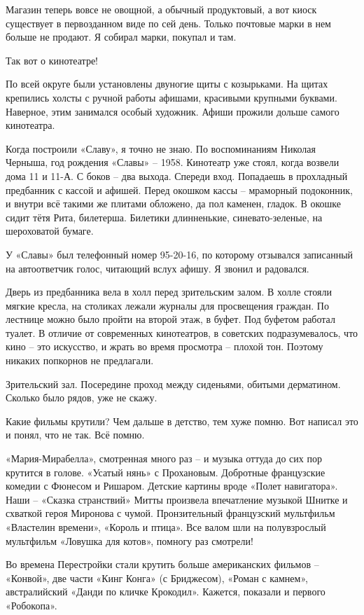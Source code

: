 Магазин теперь вовсе не овощной, а обычный продуктовый, а вот киоск существует в первозданном виде по сей день. Только почтовые марки в нем больше не продают. Я собирал марки, покупал и там.

Так вот о кинотеатре!

По всей округе были установлены двуногие щиты с козырьками. На щитах крепились холсты с ручной работы афишами, красивыми крупными буквами. Наверное, этим занимался особый художник. Афиши прожили дольше самого кинотеатра.

Когда построили «Славу», я точно не знаю. По воспоминаниям Николая Черныша, год рождения «Славы» – 1958. Кинотеатр уже стоял, когда возвели дома 11 и 11-А. С боков – два выхода. Спереди вход. Попадаешь в прохладный предбанник с кассой и афишей. Перед окошком кассы – мраморный подоконник, и внутри всё такими же плитами обложено, да пол каменен, гладок. В окошке сидит тётя Рита, билетерша. Билетики длинненькие, синевато-зеленые, на шероховатой бумаге.

У «Славы» был телефонный номер 95-20-16, по которому отзывался записанный на автоответчик голос, читающий вслух афишу. Я звонил и радовался.

Дверь из предбанника вела в холл перед зрительским залом. В холле стояли мягкие кресла, на столиках лежали журналы для просвещения граждан. По лестнице можно было пройти на второй этаж, в буфет. Под буфетом работал туалет. В отличие от современных кинотеатров, в советских подразумевалось, что кино – это искусство, и жрать во время просмотра – плохой тон. Поэтому никаких попкорнов не предлагали.

Зрительский зал. Посередине проход между сиденьями, обитыми дерматином. Сколько было рядов, уже не скажу.

Какие фильмы крутили? Чем дальше в детство, тем хуже помню. Вот написал это и понял, что не так. Всё помню.

«Мария-Мирабелла», смотренная много раз – и музыка оттуда до сих пор крутится в голове. «Усатый нянь» с Прохановым. Добротные французские комедии с Фюнесом и Ришаром. Детские картины вроде «Полет навигатора». Наши – «Сказка странствий» Митты произвела впечатление музыкой Шнитке и схваткой героя Миронова с чумой. Пронзительный французский мультфильм «Властелин времени», «Король и птица». Все валом шли на полувзрослый мультфильм «Ловушка для котов», помногу раз смотрели!

Во времена Перестройки стали крутить больше американских фильмов – «Конвой», две части «Кинг Конга» (с Бриджесом), «Роман с камнем», австралийский «Данди по кличке Крокодил». Кажется, показали и первого «Робокопа».

